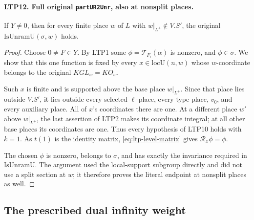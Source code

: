 \documentclass[11pt,a4paper]{article}
\numberwithin{equation}{section}
\theoremstyle{remark}\newtheorem{remark}[theorem]{Remark}
\begin{document}
\paragraph{LTP12. Full original \texttt{part\allowbreak UR2Unr}, also at nonsplit places.}
\label{claim:LTP12}
If \(Y\ne0\), then for every finite place \(w\) of \(L\) with
\(w|_{L^+}\notin V.S'\), the original
\(\mathrm{IsUnramU}(\sigma,w)\) holds.
\begin{proof}
Choose \(0\ne F\in Y\).  By LTP1 some
\(\phi=\mathcal T_{F_i}(\alpha)\) is nonzero, and \(\phi\in\sigma\).
We show that this one function is fixed by every
\(x\in\mathrm{locU}(n,w)\) whose \(w\)-coordinate belongs to
the original \(KGL_w=KO_w\).

Such \(x\) is finite and is supported above the base place
\(w|_{L^+}\).  Since that place lies outside \(V.S'\), it lies
outside every selected \(\ell\)-place, every type place, \(v_0\),
and every auxiliary place.  All of \(x\)'s coordinates there
are one.  At a different place \(w'\) above \(w|_{L^+}\), the
last assertion of LTP2 makes its coordinate integral; at all
other base places its coordinates are one.  Thus every hypothesis
of LTP10 holds with \(k=1\).
As \(t(1)\) is the identity matrix,
\eqref{eq:ltp-level-matrix} gives \(\mathscr R_x\phi=\phi\).

The chosen \(\phi\) is nonzero, belongs to \(\sigma\), and has
exactly the invariance required in \(\mathrm{IsUnramU}\).
The argument used the local-support subgroup directly and did
not use a split section at \(w\); it therefore proves the
literal endpoint at nonsplit places as well.
\end{proof}

\subsection{The prescribed dual infinity weight}

\end{document}
